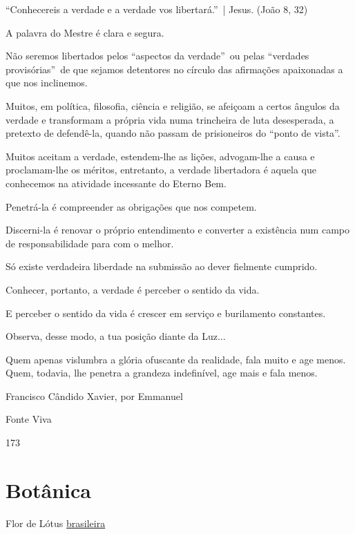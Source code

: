 \documentclass[12pt,a4paper]{article}
\begin{document}
		\textquotedblleft Conhecereis a verdade e a verdade vos libertar\'a.\textquotedblright\, | Jesus. (Jo\~ao 8, 32)

		A palavra do Mestre \'e clara e segura.

		N\~ao seremos libertados pelos \textquotedblleft aspectos da verdade\textquotedblright\, ou pelas \textquotedblleft verdades provis\'orias\textquotedblright\, de que sejamos detentores no c\'irculo das afirma\c{c}\~oes apaixonadas a que nos inclinemos.

		Muitos, em pol\'itica, filosofia, ci\^encia e religi\~ao, se afei\c{c}oam a certos \^angulos da verdade e transformam a pr\'opria vida numa trincheira de luta desesperada, a pretexto de defend\^e-la, quando n\~ao passam de prisioneiros do \textquotedblleft ponto de vista\textquotedblright.

		Muitos aceitam a verdade, estendem-lhe as li\c{c}\~oes, advogam-lhe a causa e proclamam-lhe os m\'eritos, entretanto, a verdade libertadora \'e aquela que conhecemos na atividade incessante do Eterno Bem.

		Penetr\'a-la \'e compreender as obriga\c{c}\~oes que nos competem.

		Discerni-la \'e renovar o pr\'oprio entendimento e converter a exist\^encia num campo de responsabilidade para com o melhor.

		S\'o existe verdadeira liberdade na submiss\~ao ao dever fielmente cumprido.

		Conhecer, portanto, a verdade \'e perceber o sentido da vida.

		E perceber o sentido da vida \'e crescer em servi\c{c}o e burilamento constantes.

		Observa, desse modo, a tua posi\c{c}\~ao diante da Luz...

		Quem apenas vislumbra a gl\'oria ofuscante da realidade, fala muito e age menos. Quem, todavia, lhe penetra a grandeza indefin\'ivel, age mais e fala menos.

		Francisco C\^andido Xavier, por Emmanuel

		Fonte Viva

		173

	\section{Bot\^anica}
			\begin{flushright}
			\end{flushright}

		Flor de L\'otus \href{http://en.wikipedia.org/wiki/Victoria_(waterlily)}{brasileira}
\end{document}
